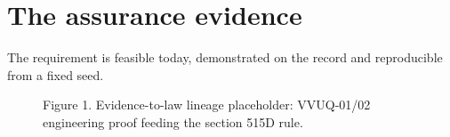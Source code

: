 \section{The assurance evidence}
\label{sec:d}

The requirement is feasible today, demonstrated on the record and reproducible from a fixed seed.

\begin{figure}[H]
  \centering
  \caption{Figure 1. Evidence-to-law lineage placeholder: VVUQ-01/02 engineering proof feeding the section 515D rule.}\label{fig:evidence}
\end{figure}
